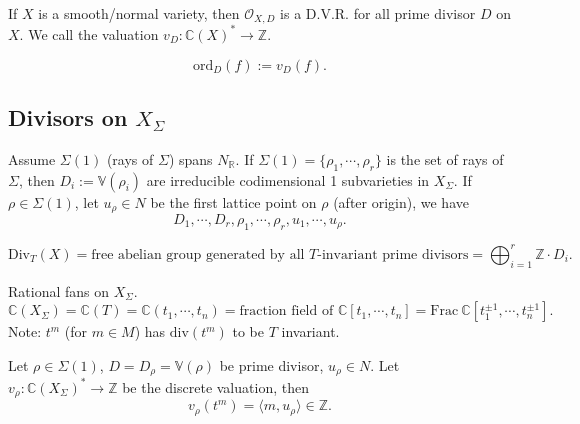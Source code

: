 \documentclass[a4paper,12pt]{amsart}
\newcommand{\ZZ}{\mathbb{Z}}
\newcommand{\RR}{\mathbb{R}}
\newcommand{\CC}{\mathbb{C}}
\begin{document}
\begin{Theorem}
	If $X$ is a smooth/normal variety, then $\mathscr{O}_{X,D}$ is a D.V.R. for all prime divisor $D$ on $X$. We call the valuation $v_D:\CC(X)^*\to\ZZ$.
\end{Theorem}

\begin{definition}
	\begin{displaymath}
	\mathrm{ord}_D(f):=v_D(f).
	\end{displaymath}
\end{definition}

\subsection{Divisors on $X_\Sigma$}

Assume $\Sigma(1)$ (rays of $\Sigma$) spans $N_\RR$. If $\Sigma(1)=\{\rho_1,\cdots,\rho_r\}$ is the set of rays of $\Sigma$, then $D_i:=\mathbb{V}(\rho_i)$ are irreducible codimensional 1 subvarieties in $X_\Sigma$. If $\rho\in\Sigma(1)$, let $u_\rho\in N$ be the first lattice point on $\rho$ (after origin), we have
\begin{displaymath}
D_1,\cdots,D_r,\rho_1,\cdots,\rho_r,u_1,\cdots,u_\rho.
\end{displaymath}

\begin{Def}
	\begin{displaymath}
	\mathrm{Div}_T(X)=\text{free abelian group generated by all }T\text{-invariant prime divisors}=\bigoplus_{i=1}^r\ZZ\cdot D_i.
	\end{displaymath}
\end{Def}

Rational fans on $X_\Sigma$.
\begin{displaymath}
\CC(X_\Sigma)=\CC(T)=\CC(t_1,\cdots,t_n)=\text{fraction field of }\CC[t_1,\cdots,t_n]=\mathrm{Frac}~\CC[t_1^{\pm1},\cdots,t_n^{\pm1}].
\end{displaymath}
Note: $t^m$ (for $m\in M$) has $\mathrm{div}(t^m)$ to be $T$ invariant.

\begin{proposition}
	Let $\rho\in\Sigma(1)$, $D=D_\rho=\mathbb{V}(\rho)$ be prime divisor, $u_\rho\in N$. Let $v_\rho:\CC(X_\Sigma)^*\to\ZZ$ be the discrete valuation, then
	\begin{displaymath}
	v_\rho(t^m)=\langle m,u_\rho\rangle\in\ZZ.
	\end{displaymath}
\end{proposition}
\end{document}
